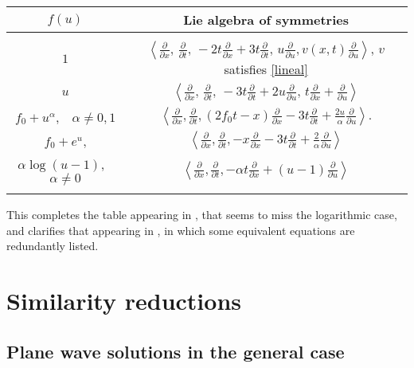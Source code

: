 \documentclass[
11pt,%
tightenlines,%
twoside,%
onecolumn,%
nofloats,%
nobibnotes,%
nofootinbib,%
superscriptaddress,%
noshowpacs,%
centertags]%
{revtex4}
\begin{document}
\begin{center}
  \begin{tabular}{ | c | c |}
    \hline
    $f(u)$ & Lie algebra of symmetries \\ \hline 
    & \\
    $1$   & 
    $\left\langle\frac{\partial}{\partial x},\, \frac{\partial}{\partial t},\,
-2t\frac{\partial}{\partial x} + 3t\frac{\partial}{\partial t},\, 
u\frac{\partial}{\partial u}, v(x,t) \frac{\partial}{\partial u}\right\rangle$, $v$ satisfies \eqref{lineal}  \\ 
    $u$   & 
    $\left\langle\frac{\partial}{\partial x},\, \frac{\partial}{\partial t},\,
 - 3t\frac{\partial}{\partial t} + 2u \frac{\partial}{\partial u},\, 
t\frac{\partial}{\partial x} + \frac{\partial}{\partial u}\right\rangle$ \\
    $f_0 + u^\alpha$,  \,\, $\alpha \neq 0, 1$ & 
    $\left\langle \frac{\partial}{\partial x}, \frac{\partial}{\partial t}, (2f_0t-x)\frac{\partial}{\partial x}- 3t\frac{\partial}{\partial t}+ \frac{2u}{\alpha}\frac{\partial}{\partial u} \right\rangle.$  \\
    $f_0 + e^u$, &
    $\left\langle \frac{\partial}{\partial x}, \frac{\partial}{\partial t}, -x\frac{\partial}{\partial x}- 3t\frac{\partial}{\partial t}+ \frac{2}{\alpha}\frac{\partial}{\partial u} \right\rangle$\\
    $\alpha \log(u-1)$, \,\,  $\alpha \neq 0$ & $\left\langle \frac{\partial}{\partial x}, \frac{\partial}{\partial t}, -\alpha t \frac{\partial}{\partial x}+(u-1)\frac{\partial}{\partial u} \right\rangle$\\ & \\
    \hline
  \end{tabular}
\end{center}

This completes the table appearing in \cite{Olver1996, Gungor2004}, that seems to miss the logarithmic case, and clarifies that appearing in \cite{Motlatsi2014}, in which some equivalent equations are redundantly listed. 

\section{Similarity reductions}

\subsection{Plane wave solutions in the general case}
\end{document}
